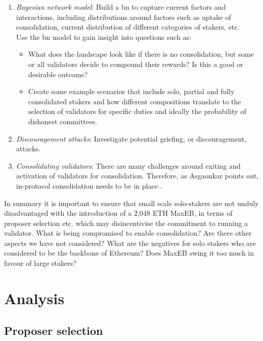 \documentclass[UTF8]{article}
\begin{document}
\begin{enumerate}
\item \textit{Bayesian network model}: Build a \gls{bn} to capture current factors and interactions, including distributions around factors such as uptake of consolidation, current distribution of different categories of stakers, etc. \\
Use the \gls{bn} model to gain insight into questions such as:
	\begin{itemize}
	\item What does the landscape look like if there is no consolidation, but some or all validators decide to compound their rewards? Is this a good or desirable outcome? 
	\item Create some example scenarios that include solo, partial and fully consolidated stakers and how different compositions translate to the selection of validators for specific duties and ideally the probability of dishonest committees.
	\end{itemize}

\item \textit{Discouragement attacks}: Investigate potential griefing, or discouragement, attacks.

\item \textit{Consolidating validators}: There are many challenges around exiting and activation of validators for consolidation. Therefore, as Asgaonkar points out, in-protocol consolidation needs to be in place \cite{Asgaonkar2023}.
 
\end{enumerate}

In summary it is important to ensure that small scale solo-stakers are not unduly disadvantaged with the introduction of a 2,048 ETH MaxEB, in terms of proposer selection etc. which may disincentivise the commitment to running a validator. What is being compromised to enable consolidation? Are there other aspects we have not considered? What are the negatives for solo stakers who are considered to be the backbone of Ethereum? Does MaxEB swing it too much in favour of large stakers?

\section{Analysis}
\label{sec:analysis}

\subsection{Proposer selection}
\end{document}
